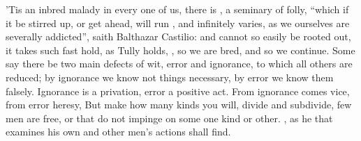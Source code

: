 
'Tis an inbred malady in every one of us, there is ,
a seminary of folly, \enquote{which if it be stirred up, or get ahead, will run , and infinitely varies, as we ourselves are severally addicted},
saith Balthazar Castilio: and cannot so easily be rooted
out, it takes such fast hold, as Tully holds, ,
so we are bred, and so we continue. Some say there be two
main defects of wit, error and ignorance, to which all others are reduced; by
ignorance we know not things necessary, by error we know them falsely.
Ignorance is a privation, error a positive act. From ignorance comes vice, from
error heresy, \etc{} But make how many kinds you will, divide and subdivide,
few men are free, or that do not impinge on some one kind or other.
, as he that
examines his own and other men's actions shall find.

